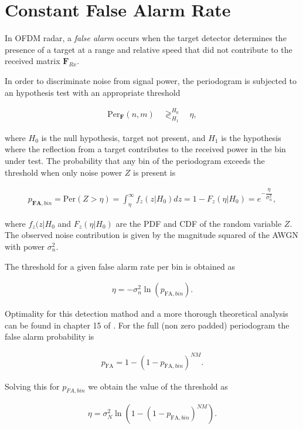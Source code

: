 \section{Constant False Alarm Rate}

In OFDM radar, a \textit{false alarm} occurs when the target detector determines the presence of a target at a range and relative speed that did not contribute to the received matrix $\bm{F}_{Rx}$.

In order to discriminate noise from signal power, the periodogram is subjected to an hypothesis test with an appropriate threshold

\begin{align}
	\text{Per}_{\bm{F}}(n,m) \quad\mathop{\gtrless}_{H_1}^{H_0}  \quad \eta,
\end{align}

where $H_0$ is the null hypothesis, target not present, and $H_1$ is the hypothesis where the reflection from a target contributes to the received power in the bin under test.
The probability that any bin of the periodogram exceeds the threshold when only noise power $Z$ is present is

\begin{align}
	p_{\textbf{FA},bin} = \text{Per}(Z > \eta) = \int_\eta^{\infty} f_z(z|H_0)dz = 1 - F_z(\eta | H_0) = e^{-\dfrac{\eta}{\sigma_n^2}},
\end{align}
 
where $f_z(z|H_0$ and $F_z(\eta | H_0)$ are the PDF and CDF of the random variable $Z$. The observed noise contribution is given by the magnitude squared of the AWGN with power $\sigma_n^2$.
 
The threshold for a given false alarm rate per bin is obtained as

\begin{align}
	\eta = -\sigma_n^2 \ln(p_{\text{FA},bin}) .
\end{align} 

Optimality for this detection mathod and a more thorough theoretical analysis can be found in chapter 15 of \cite{Richards_Scheer_Holm_2010}.
For the full (non zero padded) periodogram the false alarm probability is

\begin{align}
	p_\text{FA} = 1 - (1 - p_{\text{FA},bin})^{NM}.
\end{align}

Solving this for $p_{FA,bin}$ we obtain the value of the threshold as 

\begin{align}
	\eta = \sigma_N^2 \ln{(1 - (1 - p_{\text{FA},bin})^{NM})}.
\end{align}

